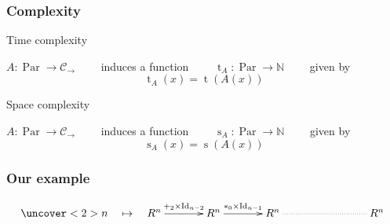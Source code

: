 \documentclass[10pt,handout]{beamer}
\newcommand{\cat}[1]{\mathscr{#1}}
\newcommand{\C}{\cat{C}}
\DeclareMathOperator{\Id}{Id}
\newcommand{\N}{\mathbb{N}}
\newcommand{\ra}{\rightarrow}
\DeclareMathOperator{\Time}{t}
\DeclareMathOperator{\Space}{s}
\DeclareMathOperator{\Par}{Par}
\begin{document}
\begin{frame}
  \frametitle{Complexity}

  \begin{block}{Time complexity}
    \begin{center}
      $A:\Par\ra\C_\ra\qquad$ induces a function
      $\qquad\Time_A:\Par\ra\N\qquad$ given by
      \[\Time_A(x) = \Time(A(x))\]
    \end{center}
  \end{block}

  \begin{block}{Space complexity}
    \begin{center}
      $A:\Par\ra\C_\ra\qquad$ induces a function
      $\qquad\Space_A:\Par\ra\N\qquad$ given by
      \[\Space_A(x) = \Space(A(x))\]
    \end{center}
  \end{block}
\end{frame}



\begin{frame}[fragile]
  \frametitle{Our example}

  \large

  \begin{center}
    \begin{minipage}{0.7\textwidth}
\begin{semiverbatim}
\end{semiverbatim}
    \end{minipage}
  \end{center}

  \vfill

  \begin{center}
    \[\uncover<2>{n \quad\mapsto\quad}\xymatrix@C=3.5em{
      R^n\ar[r]^{+_2\times{\Id_{n-2}}} & R^n\ar[r]^{*_0\times{\Id_{n-1}}} &
      R^{n} \ar@{.}[rr] && R^n
    }\]
  \end{center}
\end{frame}
\end{document}
